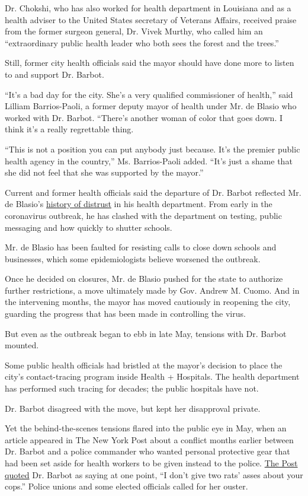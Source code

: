 Dr. Chokshi, who has also worked for health department in Louisiana and
as a health adviser to the United States secretary of Veterans Affairs,
received praise from the former surgeon general, Dr. Vivek Murthy, who
called him an ``extraordinary public health leader who both sees the
forest and the trees.''

Still, former city health officials said the mayor should have done more
to listen to and support Dr. Barbot.

``It's a bad day for the city. She's a very qualified commissioner of
health,'' said Lilliam Barrios-Paoli, a former deputy mayor of health
under Mr. de Blasio who worked with Dr. Barbot. ``There's another woman
of color that goes down. I think it's a really regrettable thing.

``This is not a position you can put anybody just because. It's the
premier public health agency in the country,'' Ms. Barrios-Paoli added.
``It's just a shame that she did not feel that she was supported by the
mayor.''

Current and former health officials said the departure of Dr. Barbot
reflected Mr. de Blasio's
\href{https://www.nytimes3xbfgragh.onion/2020/03/16/nyregion/coronavirus-bill-de-blasio.html}{history
of distrust} in his health department. From early in the coronavirus
outbreak, he has clashed with the department on testing, public
messaging and how quickly to shutter schools.

Mr. de Blasio has been faulted for resisting calls to close down schools
and businesses, which some epidemiologists believe worsened the
outbreak.

Once he decided on closures, Mr. de Blasio pushed for the state to
authorize further restrictions, a move ultimately made by Gov. Andrew M.
Cuomo. And in the intervening months, the mayor has moved cautiously in
reopening the city, guarding the progress that has been made in
controlling the virus.

But even as the outbreak began to ebb in late May, tensions with Dr.
Barbot mounted.

Some public health officials had bristled at the mayor's decision to
place the city's contact-tracing program inside Health + Hospitals. The
health department has performed such tracing for decades; the public
hospitals have not.

Dr. Barbot disagreed with the move, but kept her disapproval private.

Yet the behind-the-scenes tensions flared into the public eye in May,
when an article appeared in The New York Post about a conflict months
earlier between Dr. Barbot and a police commander who wanted personal
protective gear that had been set aside for health workers to be given
instead to the police.
\href{https://nypost.com/2020/05/13/nyc-health-commissioner-wouldnt-supply-nypd-with-masks/}{The
Post quoted} Dr. Barbot as saying at one point, ``I don't give two rats'
asses about your cops.'' Police unions and some elected officials called
for her ouster.

